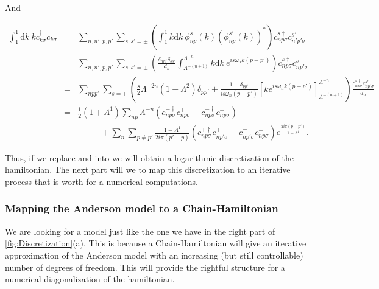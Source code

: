 And 

\begin{eqnarray}
\int_{1}^{1}\mbox{d}k\ kc_{k\sigma}^{\dagger}c_{k\sigma} & = & \sum_{n,n',p,p'}\sum_{s,s'=\pm}\left(\int_{1}^{1}k\mbox{d}k\ \phi_{np}^{s}(k)\left(\phi_{np}^{s'}(k)\right)^{*}\right)c_{np\sigma}^{s\dagger}c_{n'p'\sigma}^{s'}\nonumber \\
 & = & \sum_{n,n',p,p'}\sum_{s,s'=\pm}\left(\frac{\delta_{nn'}\delta_{ss'}}{d_{n}}\int_{\Lambda^{-(n+1)}}^{\Lambda^{-n}}k\mbox{d}k\ e^{is\omega_{n}k\left(p-p'\right)}\right)c_{np\sigma}^{s\dagger}c_{np'\sigma}^{s}\nonumber \\
 & = & \sum_{npp'}\sum_{s=\pm}\left(\frac{s}{2}\Lambda^{-2n}\left(1-\Lambda^{2}\right)\delta_{pp'}+\frac{1-\delta_{pp'}}{is\omega_{n}\left(p-p'\right)}\left[ke^{is\omega_{n}k\left(p-p'\right)}\right]_{\Lambda^{-(n+1)}}^{\Lambda^{-n}}\right)\frac{c_{np\sigma}^{s\dagger}c_{np'\sigma}^{s'}}{d_{n}}\nonumber \\
 & = & \frac{1}{2}\left(1+\Lambda^{1}\right)\sum_{np}\Lambda^{-n}\left(c_{np\sigma}^{+\dagger}c_{np\sigma}^{+}-c_{np\sigma}^{-\dagger}c_{np\sigma}^{-}\right)\nonumber \\
 &  & \ \ \ \ \ \ \!\ \ \ \ \!\ \ +\sum_{n}\sum_{p\neq p'}\frac{1-\Lambda^{1}}{2i\pi\left(p'-p\right)}\left(c_{np\sigma}^{+\dagger}c_{np'\sigma}^{+}-c_{np'\sigma}^{-\dagger}c_{np\sigma}^{-}\right)e^{\frac{2i\pi\left(p-p'\right)}{1-\Lambda^{1}}}.\label{eq:second-integral}
\end{eqnarray}


Thus, if we replace  and 
into  we will obtain a logarithmic discretization
of the hamiltonian. The next part will we to map this discretization
to an iterative process that is worth for a numerical computations. 

\subsubsection{Mapping the Anderson model to a Chain-Hamiltonian}

We are looking for a model just like the one we have in the right part of  \ref{fig:Discretization}(a).
This is because a Chain-Hamiltonian will give an iterative approximation
of the Anderson model with an increasing (but still controllable)
number of degrees of freedom. This will provide the rightful structure
for a numerical diagonalization of the hamiltonian. \\

